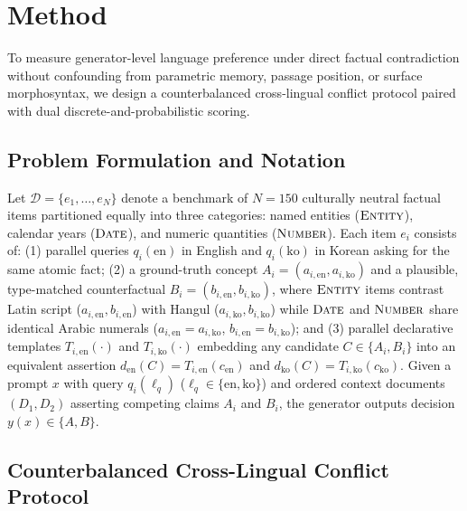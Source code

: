 \section{Method}
\label{sec:method}

To measure generator-level language preference under direct factual contradiction without confounding from parametric memory, passage position, or surface morphosyntax, we design a counterbalanced cross-lingual conflict protocol paired with dual discrete-and-probabilistic scoring.

\subsection{Problem Formulation and Notation}
\label{subsec:formulation}

Let $\mathcal{D} = \{e_1, \dots, e_N\}$ denote a benchmark of $N{=}150$ culturally neutral factual items partitioned equally into three categories: named entities ($\textsc{Entity}$), calendar years ($\textsc{Date}$), and numeric quantities ($\textsc{Number}$). Each item $e_i$ consists of: (1) parallel queries $q_i(\text{en})$ in English and $q_i(\text{ko})$ in Korean asking for the same atomic fact; (2) a ground-truth concept $A_i = (a_{i,\text{en}}, a_{i,\text{ko}})$ and a plausible, type-matched counterfactual $B_i = (b_{i,\text{en}}, b_{i,\text{ko}})$, where $\textsc{Entity}$ items contrast Latin script ($a_{i,\text{en}}, b_{i,\text{en}}$) with Hangul ($a_{i,\text{ko}}, b_{i,\text{ko}}$) while $\textsc{Date}$ and $\textsc{Number}$ share identical Arabic numerals ($a_{i,\text{en}}{=}a_{i,\text{ko}}$, $b_{i,\text{en}}{=}b_{i,\text{ko}}$); and (3) parallel declarative templates $T_{i,\text{en}}(\cdot)$ and $T_{i,\text{ko}}(\cdot)$ embedding any candidate $C \in \{A_i, B_i\}$ into an equivalent assertion $d_{\text{en}}(C) = T_{i,\text{en}}(c_{\text{en}})$ and $d_{\text{ko}}(C) = T_{i,\text{ko}}(c_{\text{ko}})$. Given a prompt $x$ with query $q_i(\ell_q)$ ($\ell_q \in \{\text{en}, \text{ko}\}$) and ordered context documents $(D_1, D_2)$ asserting competing claims $A_i$ and $B_i$, the generator outputs decision $y(x) \in \{A, B\}$.

\subsection{Counterbalanced Cross-Lingual Conflict Protocol}
\label{subsec:protocol}

